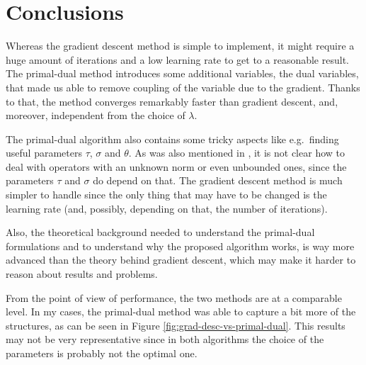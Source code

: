 \documentclass{paper}
\begin{document}
\section{Conclusions}
Whereas the gradient descent method is simple to implement, it might require a huge amount of iterations and a low learning rate to get to a reasonable result. 
The primal-dual method introduces some additional variables, the dual variables, that made us able to remove coupling of the variable due to the gradient. 
Thanks to that, the method converges remarkably faster than gradient descent, and, moreover, independent from the choice of $\lambda$.

The primal-dual algorithm also contains some tricky aspects like e.g.\ finding useful parameters $\tau$, $\sigma$ and $\theta$. As was also mentioned in \cite{chambolle2011first}, it is not clear how to deal with operators with an unknown norm or even unbounded ones, since the parameters $\tau$ and $\sigma$ do depend on that. The gradient descent method is much simpler to handle since the only thing that may have to be changed is the learning rate (and, possibly, depending on that, the number of iterations).

Also, the theoretical background needed to understand the primal-dual formulations and to understand why the proposed algorithm works, is way more advanced than the theory behind gradient descent, which may make it harder to reason about results and problems.

From the point of view of performance, the two methods are at a comparable level. In my cases, the primal-dual method was able to capture a bit more of the structures, as can be seen in Figure \ref{fig:grad-desc-vs-primal-dual}. This results may not be very representative since in both algorithms the choice of the parameters is probably not the optimal one.
\end{document}
